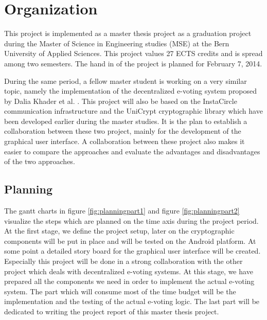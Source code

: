 \documentclass[numbers=noenddot, abstract=on, a4paper, headsepline,
footsepline, oneside, draft=off]{scrreprt}
\begin{document}
\chapter{Organization}
\label{cha:organization}
This project is implemented as a master thesis project as a graduation project
during the Master of Science in Engineering studies (MSE) at the Bern University
of Applied Sciences. This project values 27 ECTS credits and is spread among two
semesters. The hand in of the project is planned for February 7, 2014.

During the same period, a fellow master student is working on a very similar
topic, namely the implementation of the decentralized e-voting system proposed by
Dalia Khader et al. \cite{HKRS12}. This project will also be based on the
InstaCircle communication infrastructure \cite{ritter13a} and the UniCrypt
cryptographic library \cite{ritter12} which have been developed earlier during
the master studies. It is the plan to establish a collaboration between these
two project, mainly for the development of the graphical user interface. A
collaboration between these project also makes it easier to compare the
approaches and evaluate the advantages and disadvantages of the two approaches.

\section{Planning}
\label{sec:planning}
The gantt charts in figure \ref{fig:planningpart1} and figure
\ref{fig:planningpart2} visualize the steps which are planned on the time axis
during the project period. At the first stage, we define the project setup,
later on the cryptographic components will be put in place and will be tested on
the Android platform. At some point a detailed story board for the graphical
user interface will be created. Especially this project will be done in a strong
collaboration with the other project which deals with decentralized e-voting
systems. At this stage, we have prepared all the components we need in order to
implement the actual e-voting system. The part which will consume most of the
time budget will be the implementation and the testing of the actual e-voting
logic. The last part will be dedicated to writing the project report of this
master thesis project.
\end{document}
